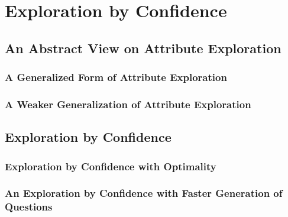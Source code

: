 
\chapter{Exploration by Confidence}
\label{cha:expl-conf}


\section{An Abstract View on Attribute Exploration}
\label{sec:an-abstract-view}

%
%

\subsection{A Generalized Form of Attribute Exploration}
\label{sec:gener-form-attr}


\subsection{A Weaker Generalization of Attribute Exploration}
\label{sec:weak-gener-attr}


\section{Exploration by Confidence}
\label{sec:expl-conf}


\subsection{Exploration by Confidence with Optimality}
\label{sec:expl-conf-1}


\subsection{An Exploration by Confidence with Faster Generation of Questions}
\label{sec:poss-fast-expl}


